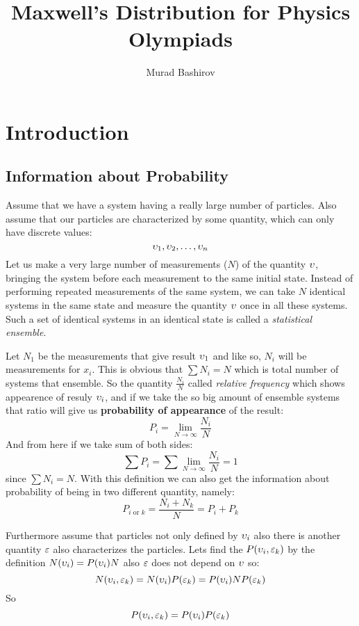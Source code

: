 \documentclass[a4paper, 12pt]{article}
\title{Maxwell's Distribution for Physics Olympiads}
\author{Murad Bashirov}
\date{}
\begin{document}
\begin{titlepage}
    \maketitle
    \tableofcontents
    \thispagestyle{empty}
\end{titlepage}
\section{Introduction}
\subsection{Information about Probability}
Assume that we have a system having a really large number of particles.
Also assume that our particles are characterized by some quantity, which can only have discrete values:
$$\upsilon_1,\upsilon_2,\ldots,\upsilon_n$$
Let us make a very large number of measurements ($N$) of the quantity $\upsilon$, bringing the system before 
each measurement to the same initial state. Instead of performing repeated measurements of the
same system, we can take $N$ identical systems in the same state and measure the quantity 
$\upsilon$ once in all these systems. Such a set of identical systems in an identical state is called a 
\emph{statistical ensemble}.

Let $N_1$ be the measurements that give result $\upsilon_1$ and like so, $N_i$ will be measurements for $x_i$.
This is obvious that $\sum N_i = N$ which is total number of systems that ensemble. So the quantity $\frac{N_i}{N}$ called 
\emph{relative frequency} which shows appearence of resuly $\upsilon_i$, and if we take the so big amount of ensemble systems
that ratio will give us \textbf{probability of appearance} of the result: $$P_i=\lim_{N\to\infty}\frac{N_i}{N}$$
And from here if we take sum of both sides:$$\sum P_i =\sum \lim_{N\to\infty}\frac{N_i}{N}=1$$
since $\sum N_i =N$. With this definition we can also get the information about probability of being in two different quantity, namely:
$$P_{i\text{ or }k}=\frac{N_i+N_k}{N}=P_i+P_k$$

Furthermore assume that particles not only defined by $\upsilon_i$ also there is another quantity $\varepsilon$ also characterizes the particles.
Lets find  the $P(\upsilon_i,\varepsilon_k )$ by the definition $N(\upsilon_i)=P(\upsilon_i)N$ also $\varepsilon$ does not depend on $\upsilon$ so:
$$N(\upsilon_i,\varepsilon_k)=N(\upsilon_i)P(\varepsilon_k)=P(\upsilon_i)NP(\varepsilon_k)$$
So \begin{equation} \label{eq:multiply}
    P(\upsilon_i,\varepsilon_k )=P(\upsilon_i)P(\varepsilon_k)
\end{equation}
\end{document}
